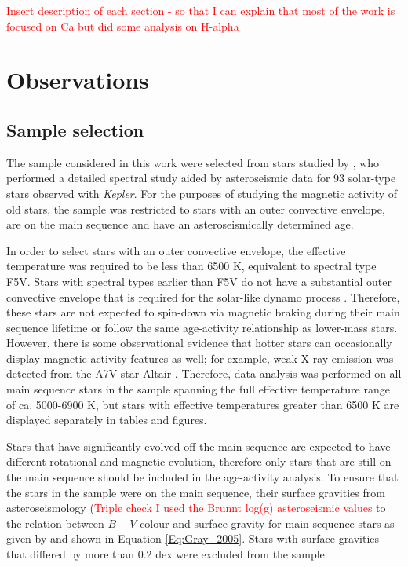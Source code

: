 \textcolor{red}{Insert description of each section - so that I can explain that most of the work is focused on Ca but did some analysis on H-alpha}

\section{Observations}
\subsection{Sample selection}
The sample considered in this work were selected from stars studied by \citet{Bruntt_etal_2012}, who performed a detailed spectral study aided by asteroseismic data for 93 solar-type stars observed with \textit{Kepler}. For the purposes of studying the magnetic activity of old stars, the sample was restricted to stars with an outer convective envelope, are on the main sequence and have an asteroseismically determined age.

In order to select stars with an outer convective envelope, the effective temperature was required to be less than 6500 K, equivalent to spectral type F5V. Stars with spectral types earlier than F5V do not have a substantial outer convective envelope that is required for the solar-like dynamo process \citep{Pinsonneault_etal_2001}. Therefore, these stars are not expected to spin-down via magnetic braking during their main sequence lifetime or follow the same age-activity relationship as lower-mass stars. However, there is some observational evidence that hotter stars can occasionally display magnetic activity features as well; for example, weak X-ray emission was detected from the A7V star Altair \citep{Robrade_Schmitt_2009}. Therefore, data analysis was performed on all main sequence stars in the sample spanning the full effective temperature range of ca. 5000-6900 K, but stars with effective temperatures greater than 6500 K are displayed separately in tables and figures.

Stars that have significantly evolved off the main sequence are expected to have different rotational and magnetic evolution, therefore only stars that are still on the main sequence should be included in the age-activity analysis. To ensure that the stars in the sample were on the main sequence, their surface gravities \citep{Bruntt_etal_2012} from asteroseismology (\textcolor{red}{Triple check I used the Brunnt log(g) asteroseismic values} to the relation between $B-V$ colour and surface gravity for main sequence stars as given by \citet{Gray_2005} and shown in Equation \ref{Eq:Gray_2005}. Stars with surface gravities that differed by more than 0.2 dex were excluded from the sample.

